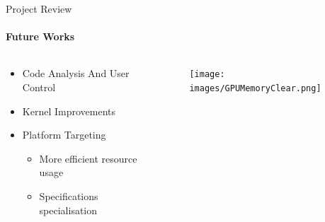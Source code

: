 	\begin{frame}[t]{Project Review}\framesubtitle{Future Works}
	\begin{columns}[T]
	\begin{column}{0.48\textwidth}
		\begin{itemize}
			\item Code Analysis And User Control
			\item Kernel Improvements
			\item Platform Targeting
			\begin{itemize}
				\item More efficient resource usage
				\item Specifications specialisation
			\end{itemize}
		\end{itemize}
	\end{column}
	\begin{column}{.48\textwidth}
      \begin{figure}
         \texttt{[image: images/GPUMemoryClear.png]}
      \end{figure}
    \end{column}
    \end{columns}
	\end{frame}